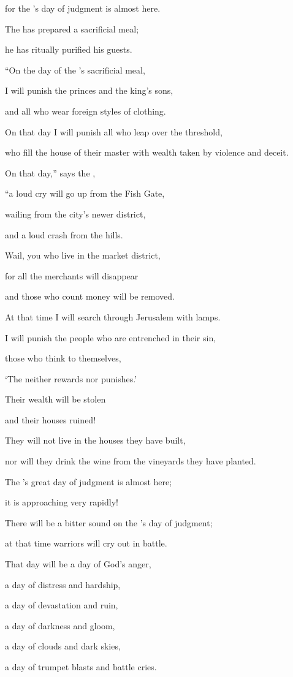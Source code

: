 {\par }{\Q for
the
{}’s
day
of judgment is almost here.
\par }{\Q The
{}
has prepared
a sacrificial meal;
\par }{\Q he has ritually purified
his guests.
\par }{\Q {}“On the day
of the
{}’s
sacrificial
meal,
\par }{\Q I will punish
the princes
and the king’s
sons,
\par }{\Q and all
who wear
foreign
styles of clothing.
\par }{\Q {}On
that day
I will punish
all
who leap
over
the threshold,
\par }{\Q who fill
the house
of their master
with wealth taken by violence
and deceit.
\par }{\Q {}On that day,”
says
the {},
\par }{\Q “a loud
cry
will go up from the Fish
Gate,
\par }{\Q wailing
from
the city’s newer district,
\par }{\Q and a loud
crash
from the hills.
\par }{\Q {}Wail,
you who live in
the market district,
\par }{\Q for
all
the merchants
will disappear
\par }{\Q and those who
count
money
will be removed.
\par }{\Q {}At that time
I will search
through Jerusalem
with lamps.
\par }{\Q I will punish
the people
who are entrenched
in their
sin,

\par }{\Q those who think
to themselves,

\par }{\Q ‘The
{}
neither
rewards
nor
punishes.’
\par }{\Q {}Their wealth
will be
stolen
\par }{\Q and their houses
ruined!
\par }{\Q They will not
live
in the houses
they have built,
\par }{\Q nor
will they drink
the
wine
from the vineyards
they have planted.
\par }{\Q {}The
{}’s
great
day
of judgment is almost
here;
\par }{\Q it is approaching
very
rapidly!
\par }{\Q There
will be a bitter
sound
on
the
{}’s
day
of judgment;
\par }{\Q at that time warriors will cry out in battle.
\par }{\Q {}That day
will be a day
of God’s anger,
\par }{\Q a day
of distress
and hardship,
\par }{\Q a day
of devastation
and ruin,
\par }{\Q a day
of darkness
and gloom,
\par }{\Q a day
of clouds
and dark skies,
\par }{\Q {}a day
of trumpet
blasts
and battle cries.

}
